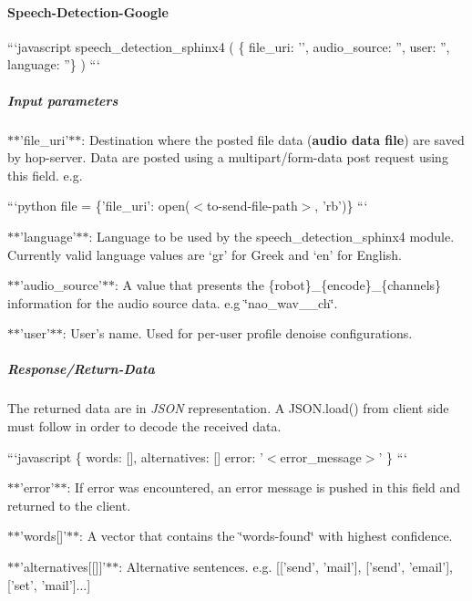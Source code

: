 \paragraph*{Speech-\/\-Detection-\/\-Google}

```javascript speech\-\_\-detection\-\_\-sphinx4 ( \{ file\-\_\-uri\-: '', audio\-\_\-source\-: '', user\-: '', language\-: ''\} ) ```

\subparagraph*{Input parameters}


\begin{DoxyItemize}
\item $\ast$$\ast$'file\-\_\-uri'$\ast$$\ast$\-: Destination where the posted file data ({\bfseries audio data file}) are saved by hop-\/server. Data are posted using a multipart/form-\/data post request using this field. e.\-g.
\end{DoxyItemize}

```python file = \{'file\-\_\-uri'\-: open($<$to-\/send-\/file-\/path$>$, 'rb')\} ```


\begin{DoxyItemize}
\item $\ast$$\ast$'language'$\ast$$\ast$\-: Language to be used by the speech\-\_\-detection\-\_\-sphinx4 module. Currently valid language values are ‘gr’ for Greek and ‘en’ for English.
\item $\ast$$\ast$'audio\-\_\-source'$\ast$$\ast$\-: A value that presents the \{robot\}\-\_\-\{encode\}\-\_\-\{channels\} information for the audio source data. e.\-g \char`\"{}nao\-\_\-wav\-\_\-\_\-ch\char`\"{}.
\item $\ast$$\ast$'user'$\ast$$\ast$\-: User’s name. Used for per-\/user profile denoise configurations.
\end{DoxyItemize}

\subparagraph*{Response/\-Return-\/\-Data}

The returned data are in {\itshape J\-S\-O\-N} representation. A J\-S\-O\-N.\-load() from client side must follow in order to decode the received data.

```javascript \{ words\-: \mbox{[}\mbox{]}, alternatives\-: \mbox{[}\mbox{]} error\-: '$<$error\-\_\-message$>$' \} ```


\begin{DoxyItemize}
\item $\ast$$\ast$'error'$\ast$$\ast$\-: If error was encountered, an error message is pushed in this field and returned to the client.
\item $\ast$$\ast$'words\mbox{[}\mbox{]}'$\ast$$\ast$\-: A vector that contains the \char`\"{}words-\/found\char`\"{} with highest confidence.
\item $\ast$$\ast$'alternatives\mbox{[}\mbox{[}\mbox{]}\mbox{]}'$\ast$$\ast$\-: Alternative sentences. e.\-g. \mbox{[}\mbox{[}'send', 'mail'\mbox{]}, \mbox{[}'send', 'email'\mbox{]}, \mbox{[}'set', 'mail'\mbox{]}...\mbox{]}
\end{DoxyItemize}

